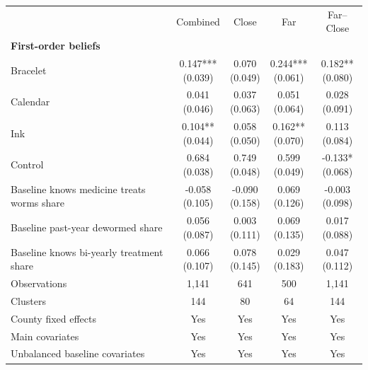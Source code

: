 \begin{tabular}{lcccc}
\toprule
 & Combined & Close & Far & Far--Close \\
\multicolumn{5}{l}{\textbf{First-order beliefs}} \\
\addlinespace[0.2em]
Bracelet & \makecell[c]{0.147***\\{(0.039)}} & \makecell[c]{0.070\\{(0.049)}} & \makecell[c]{0.244***\\{(0.061)}} & \makecell[c]{0.182**\\{(0.080)}} \\
Calendar & \makecell[c]{0.041\\{(0.046)}} & \makecell[c]{0.037\\{(0.063)}} & \makecell[c]{0.051\\{(0.064)}} & \makecell[c]{0.028\\{(0.091)}} \\
Ink & \makecell[c]{0.104**\\{(0.044)}} & \makecell[c]{0.058\\{(0.050)}} & \makecell[c]{0.162**\\{(0.070)}} & \makecell[c]{0.113\\{(0.084)}} \\
Control & \makecell[c]{0.684\\{(0.038)}} & \makecell[c]{0.749\\{(0.048)}} & \makecell[c]{0.599\\{(0.049)}} & \makecell[c]{-0.133*\\{(0.068)}} \\
\addlinespace[0.3em]
Baseline knows medicine treats worms share & \makecell[c]{-0.058\\{(0.105)}} & \makecell[c]{-0.090\\{(0.158)}} & \makecell[c]{0.069\\{(0.126)}} & \makecell[c]{-0.003\\{(0.098)}} \\
Baseline past-year dewormed share & \makecell[c]{0.056\\{(0.087)}} & \makecell[c]{0.003\\{(0.111)}} & \makecell[c]{0.069\\{(0.135)}} & \makecell[c]{0.017\\{(0.088)}} \\
Baseline knows bi-yearly treatment share & \makecell[c]{0.066\\{(0.107)}} & \makecell[c]{0.078\\{(0.145)}} & \makecell[c]{0.029\\{(0.183)}} & \makecell[c]{0.047\\{(0.112)}} \\
\addlinespace[0.3em]
Observations & 1,141 & 641 & 500 & 1,141 \\
Clusters & 144 & 80 & 64 & 144 \\
County fixed effects & Yes & Yes & Yes & Yes \\
Main covariates & Yes & Yes & Yes & Yes \\
Unbalanced baseline covariates & Yes & Yes & Yes & Yes \\
\bottomrule
\end{tabular}
